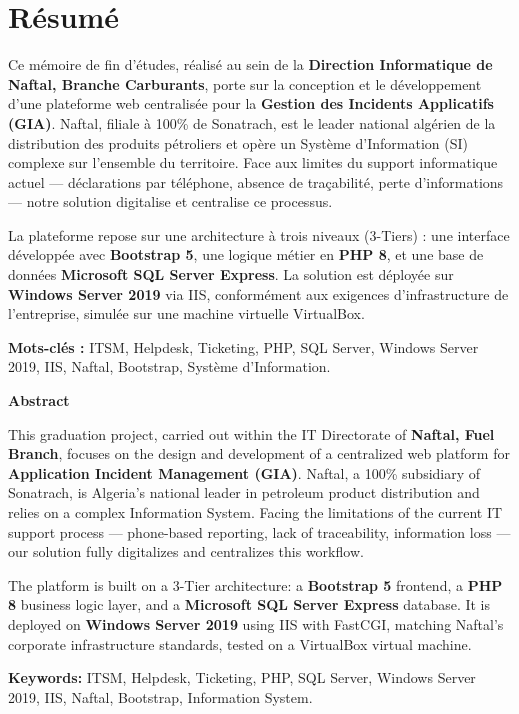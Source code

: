 \chapter*{Résumé}

Ce mémoire de fin d'études, réalisé au sein de la \textbf{Direction Informatique de Naftal,
Branche Carburants}, porte sur la conception et le développement d'une plateforme web
centralisée pour la \textbf{Gestion des Incidents Applicatifs (GIA)}. Naftal, filiale à 100\%
de Sonatrach, est le leader national algérien de la distribution des produits pétroliers et
opère un Système d'Information (SI) complexe sur l'ensemble du territoire. Face aux
limites du support informatique actuel — déclarations par téléphone, absence de
traçabilité, perte d'informations — notre solution digitalise et centralise ce processus.

La plateforme repose sur une architecture à trois niveaux (3-Tiers) : une interface
développée avec \textbf{Bootstrap 5}, une logique métier en \textbf{PHP 8}, et une base de
données \textbf{Microsoft SQL Server Express}. La solution est déployée sur
\textbf{Windows Server 2019} via IIS, conformément aux exigences d'infrastructure de
l'entreprise, simulée sur une machine virtuelle VirtualBox.

\vspace{0.5cm}
\noindent\textbf{Mots-clés :} ITSM, Helpdesk, Ticketing, PHP, SQL Server, Windows Server 2019, IIS, Naftal, Bootstrap, Système d'Information.

\vspace{2cm}
\begin{center} \Large \textbf{Abstract} \end{center}

This graduation project, carried out within the IT Directorate of \textbf{Naftal, Fuel
Branch}, focuses on the design and development of a centralized web platform for
\textbf{Application Incident Management (GIA)}. Naftal, a 100\% subsidiary of
Sonatrach, is Algeria's national leader in petroleum product distribution and relies on a
complex Information System. Facing the limitations of the current IT support process —
phone-based reporting, lack of traceability, information loss — our solution fully
digitalizes and centralizes this workflow.

The platform is built on a 3-Tier architecture: a \textbf{Bootstrap 5} frontend, a
\textbf{PHP 8} business logic layer, and a \textbf{Microsoft SQL Server Express} database.
It is deployed on \textbf{Windows Server 2019} using IIS with FastCGI, matching Naftal's
corporate infrastructure standards, tested on a VirtualBox virtual machine.

\vspace{0.5cm}
\noindent\textbf{Keywords:} ITSM, Helpdesk, Ticketing, PHP, SQL Server, Windows Server 2019, IIS, Naftal, Bootstrap, Information System.
